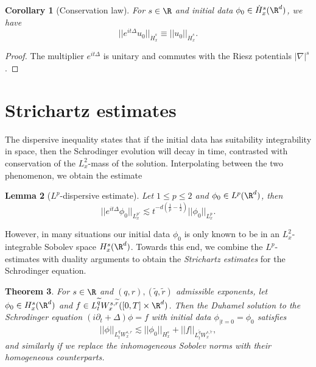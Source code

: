 \documentclass[reqno]{amsart}
\newtheorem{theorem}{Theorem}
\newtheorem{lemma}[theorem]{Lemma}
\newtheorem{corollary}[theorem]{Corollary}
\theoremstyle{definition}
\theoremstyle{remark}
\begin{document}
\begin{corollary}[Conservation law]
	For $s \in \R$ and initial data $\phi_0 \in \dot H^s_x (\R^d)$, we have
		\[ ||e^{it \Delta} u_0||_{\dot H^s_x} \equiv ||u_0||_{\dot H^s_x}. \]
\end{corollary}

\begin{proof}
	The multiplier $e^{i t \Delta}$ is unitary and commutes with the Riesz potentials $|\nabla|^s$. 
\end{proof}

	
\section{Strichartz estimates}

The dispersive inequality states that if the initial data has suitability integrability in space, then the Schrodinger evolution will decay in time, contrasted with conservation of the $L^2_x$-mass of the solution. Interpolating between the two phenomenon, we obtain the estimate

\begin{lemma}[$L^p$-dispersive estimate]
	Let $1 \leq p \leq 2$ and $\phi_0 \in L^p (\R^d)$, then 
		\[ ||e^{it \Delta} \phi_0||_{L^{p'}_x} \lesssim  t^{-d (\frac1p - \frac12)} ||\phi_0||_{L^p_x}. \]
\end{lemma}

However, in many situations our initial data $\phi_0$ is only known to be in an $L^2_x$-integrable Sobolev space $H^s_x (\R^d)$. Towards this end, we combine the $L^p$-estimates with duality arguments to obtain the \textit{Strichartz estimates} for the Schrodinger equation. 

\begin{theorem}
	For $s \in \R$ and $(q, r), (\widetilde q, \widetilde r)$ admissible exponents, let $\phi_0 \in H^s_x (\R^d)$ and $f \in L^{\widetilde q}_t W^{s, \widetilde r}_x ([0, T] \times \R^d)$. Then the Duhamel solution to the Schrodinger equation $(i \partial_t + \Delta) \phi = f$ with initial data $\phi_{|t = 0} = \phi_0$ satisfies
		\[ ||\phi||_{L^q_t W^{s, r}_x} \lesssim ||\phi_0||_{H^s_x} + ||f||_{L^{\widetilde q}_t W^{s, \widetilde r}_x}, \]
	and similarly if we replace the inhomogeneous Sobolev norms with their homogeneous counterparts. 	
\end{theorem}
\end{document}
